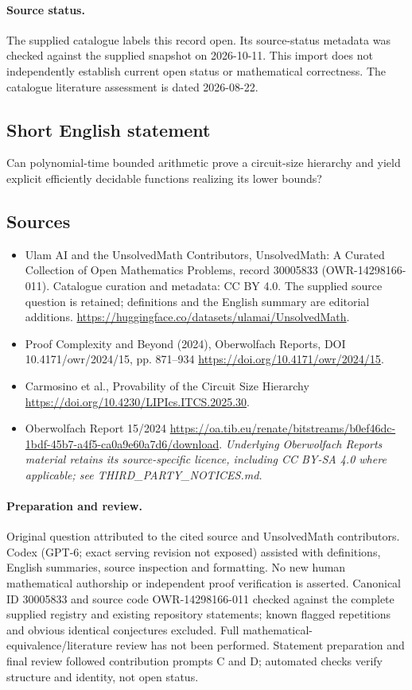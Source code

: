 \documentclass[11pt]{article}
\begin{document}
\paragraph{Source status.}
The supplied catalogue labels this record open. Its source-status metadata was checked against the supplied snapshot on 2026-10-11. This import does not independently establish current open status or mathematical correctness. The catalogue literature assessment is dated 2026-08-22.
\subsection{Short English statement}
Can polynomial-time bounded arithmetic prove a circuit-size hierarchy and yield explicit efficiently decidable functions realizing its lower bounds?
\subsection{Sources}
\begin{itemize}
\item[\hypertarget{source:30005833:1}{S1}] Ulam AI and the UnsolvedMath Contributors, UnsolvedMath: A Curated Collection of Open Mathematics Problems, record 30005833 (OWR-14298166-011). Catalogue curation and metadata: CC BY 4.0. The supplied source question is retained; definitions and the English summary are editorial additions.
\url{https://huggingface.co/datasets/ulamai/UnsolvedMath}.
\item[\hypertarget{source:30005833:2}{S2}] Proof Complexity and Beyond (2024), Oberwolfach Reports, DOI 10.4171/owr/2024/15, pp. 871--934
\url{https://doi.org/10.4171/owr/2024/15}.
\item[\hypertarget{source:30005833:3}{S3}] Carmosino et al., Provability of the Circuit Size Hierarchy
\url{https://doi.org/10.4230/LIPIcs.ITCS.2025.30}.
\item[\hypertarget{source:30005833:4}{S4}] Oberwolfach Report 15/2024
\url{https://oa.tib.eu/renate/bitstreams/b0ef46dc-1bdf-45b7-a4f5-ca0a9e60a7d6/download}.
\textit{Underlying Oberwolfach Reports material retains its source-specific licence, including CC BY-SA 4.0 where applicable; see THIRD\_PARTY\_NOTICES.md.}
\end{itemize}
\paragraph{Preparation and review.}
Original question attributed to the cited source and UnsolvedMath contributors. Codex (GPT-6; exact serving revision not exposed) assisted with definitions, English summaries, source inspection and formatting. No new human mathematical authorship or independent proof verification is asserted. Canonical ID 30005833 and source code OWR-14298166-011 checked against the complete supplied registry and existing repository statements; known flagged repetitions and obvious identical conjectures excluded. Full mathematical-equivalence/literature review has not been performed. Statement preparation and final review followed contribution prompts C and D; automated checks verify structure and identity, not open status.
\label{end:30005833}
\end{document}
